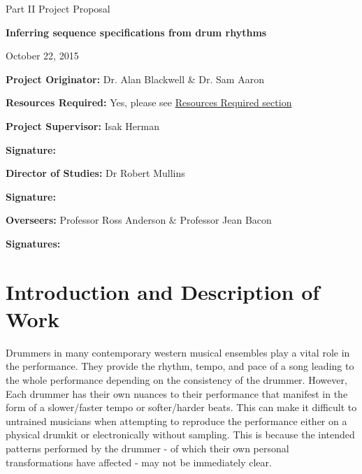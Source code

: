 \documentclass[12pt,a4]{article}
\begin{document}
    \thispagestyle{empty}

    \medskip
    \medskip

    \vfil

    \centerline{\large Part II Project Proposal}
    \vspace{0.4in}
    \centerline{\Large\bf Inferring sequence specifications from drum rhythms}
    \centerline{\large October 22, 2015}

    \vfil

    {\bf Project Originator:} Dr. Alan Blackwell \& Dr. Sam Aaron

    \vspace{0.1in}

    {\bf Resources Required:} Yes, please see \hyperref[sec:Resources]{Resources Required section}

    \vspace{0.5in}

    {\bf Project Supervisor:} Isak Herman

    \vspace{0.2in}

    {\bf Signature:}

    \vspace{0.5in}

    {\bf Director of Studies:} Dr Robert Mullins

    \vspace{0.2in}

    {\bf Signature:}

    \vspace{0.5in}

    {\bf Overseers:} Professor Ross Anderson \& Professor Jean Bacon

    \vspace{0.2in}

    {\bf Signatures:}


    \vfil

    \eject

    \section{Introduction and Description of Work}

Drummers in many contemporary western musical ensembles play a vital role in the performance. They provide the rhythm, tempo, and pace of a song leading to the whole performance depending on the consistency of the drummer. However, Each drummer has their own nuances to their performance that manifest in the form of a slower/faster tempo or softer/harder beats. This can make it difficult to untrained musicians when attempting to reproduce the performance either on a physical drumkit or electronically without sampling. This is because the intended patterns performed by the drummer - of which their own personal transformations have affected - may not be immediately clear.
\end{document}
